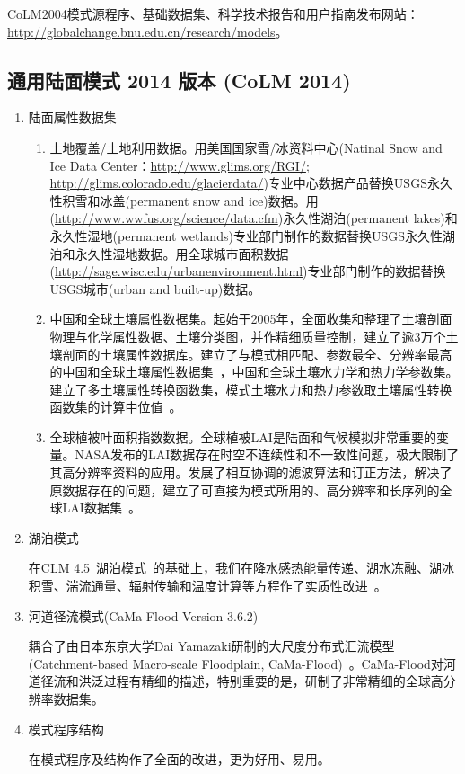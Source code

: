 CoLM2004模式源程序、基础数据集、科学技术报告和用户指南发布网站： \url{http://globalchange.bnu.edu.cn/research/models}。


\subsection{通用陆面模式 2014 版本 (CoLM 2014)}

\begin{enumerate}[label={\arabic*)}]
    \item 陆面属性数据集
    \begin{enumerate}[label={\alph*)}]
    \item 土地覆盖/土地利用数据。用美国国家雪/冰资料中心(Natinal Snow and Ice Data Center：\url{http://www.glims.org/RGI/}; \url{http://glims.colorado.edu/glacierdata/})专业中心数据产品替换USGS永久性积雪和冰盖(permanent snow and ice)数据。用(\url{http://www.wwfus.org/science/data.cfm})永久性湖泊(permanent lakes)和永久性湿地(permanent wetlands)专业部门制作的数据替换USGS永久性湖泊和永久性湿地数据。用全球城市面积数据(\url{http://sage.wisc.edu/urbanenvironment.html})专业部门制作的数据替换USGS城市(urban and built-up)数据。
    \item 中国和全球土壤属性数据集。起始于2005年，全面收集和整理了土壤剖面物理与化学属性数据、土壤分类图，并作精细质量控制，建立了逾3万个土壤剖面的土壤属性数据库。建立了与模式相匹配、参数最全、分辨率最高的中国和全球土壤属性数据集~\citep{shangguan2013china,shangguan2014global}，中国和全球土壤水力学和热力学参数集。建立了多土壤属性转换函数集，模式土壤水力和热力参数取土壤属性转换函数集的计算中位值~\citep{dai2013development}。
    \item 全球植被叶面积指数数据。全球植被LAI是陆面和气候模拟非常重要的变量。NASA发布的LAI数据存在时空不连续性和不一致性问题，极大限制了其高分辨率资料的应用。发展了相互协调的滤波算法和订正方法，解决了原数据存在的问题，建立了可直接为模式所用的、高分辨率和长序列的全球LAI数据集~\citep{yuan2011reprocessing}。
    \end{enumerate}
    \item 湖泊模式

    在CLM 4.5~\citep{oleson2013technical}湖泊模式~\citep{subin2012improved}的基础上，我们在降水感热能量传递、湖水冻融、湖冰积雪、湍流通量、辐射传输和温度计算等方程作了实质性改进~\citep{戴永久2018通用陆面模式}。
    
    \item 河道径流模式(CaMa-Flood Version 3.6.2)

    耦合了由日本东京大学Dai Yamazaki研制的大尺度分布式汇流模型  (Catchment-based Macro-scale Floodplain, CaMa-Flood)~\citep{yamazaki2011physically}。CaMa-Flood对河道径流和洪泛过程有精细的描述，特别重要的是，研制了非常精细的全球高分辨率数据集。

    \item 模式程序结构

    在模式程序及结构作了全面的改进，更为好用、易用。
\end{enumerate}

